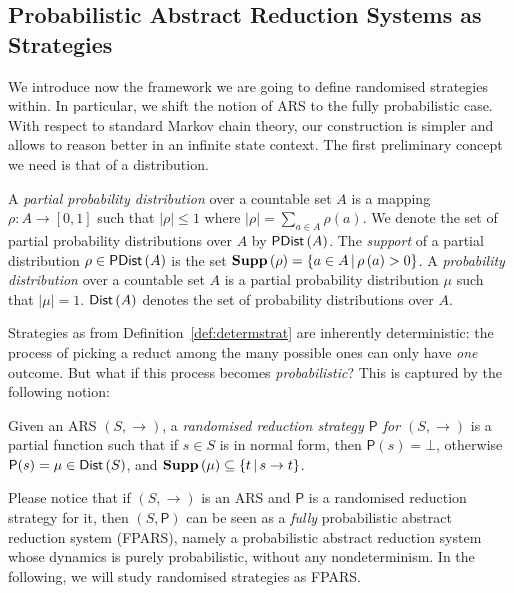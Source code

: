 \subsection{Probabilistic Abstract Reduction Systems as Strategies}
We introduce now the framework we are going to define randomised
strategies within. In particular, we shift the notion of ARS to the fully
probabilistic case. With respect to standard Markov chain theory, our
construction is simpler and allows to reason better in an infinite
state context. The first preliminary concept we need is that of a distribution.
\begin{definition}[Distribution]
	A \emph{partial probability distribution} over a countable set $A$
	is a mapping $\rho:A\rightarrow\left[0,1\right]$ such that
	$\left|\rho\right|\leq 1$ where
	$\left|\rho\right|=\underset{a\in A}{\sum}\rho\left(a\right)$. We denote the set of partial probability distributions over $A$
	by $\textsf{PDist}\left(A\right)$. The \emph{support} of a partial distribution
	$\rho\in\textsf{PDist}\left(A\right)$ is the set $\textbf{Supp}\left(\rho\right)=\left\lbrace a \in A \, |
	\, \rho\left( a\right) >0\right\rbrace $.  A \emph{probability
		distribution} over a countable set $A$ is a partial probability
	distribution $\mu$ such that $\left|\mu\right|=1$. $\textsf{Dist}\left(A\right)$ denotes the set
	of probability distributions over $A$.
\end{definition}
Strategies as from Definition~\ref{def:determstrat} are inherently
deterministic: the process of picking a reduct among the many possible
ones can only have \emph{one} outcome. But what if this process becomes
\emph{probabilistic}? This is captured by the following notion:
\begin{definition}
	Given an ARS $(S,\rightarrow)$, a
	\emph{randomised reduction strategy $\mathsf{P}$ for $(S,\rightarrow)$}
	is a partial function such that if $s\in S$ is in normal form, then
	$\mathsf{P}(s)=\bot$, otherwise $\mathsf{P}(s)=\mu\in\textsf{Dist}\left(S\right)$, and
	$\textbf{Supp}\left(\mu\right)\subseteq\{t\,|\,s\rightarrow t\}$.
\end{definition}
Please notice that if $(S,\rightarrow)$ is an ARS and 
$\mathsf{P}$ is a randomised reduction strategy for it,
then $(S,\mathsf{P})$ can be seen as a \emph{fully} probabilistic abstract
reduction system (FPARS), namely a probabilistic abstract reduction
system~\cite{avanzini_probabilistic_2018} whose dynamics is purely
probabilistic, without any nondeterminism. In the following, we will
study randomised strategies as FPARS.

